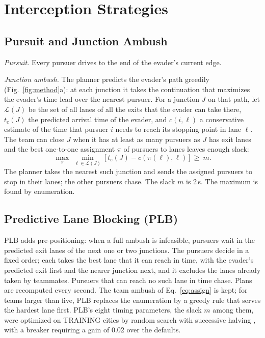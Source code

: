 \documentclass[5p,twocolumn]{elsarticle}
\begin{document}
\section{Interception Strategies}
\label{sec:strategies}

\subsection{Pursuit and Junction Ambush}

\emph{Pursuit.} Every pursuer drives to the end of the evader's current edge.

\emph{Junction ambush.} The planner predicts the evader's path greedily (Fig.~\ref{fig:method}a): at each junction it
takes the continuation that maximizes the evader's time lead over the nearest pursuer. For a junction $J$ on that
path, let $\mathcal{L}(J)$ be the set of all lanes of all the exits that the evader can take there, $t_e(J)$ the predicted
arrival time of the evader, and $c(i,\ell)$ a conservative estimate of the time that pursuer $i$ needs to reach its stopping point in lane
$\ell$. The team can close $J$ when it has at least as many pursuers as $J$ has exit lanes and the best one-to-one
assignment $\pi$ of pursuers to lanes leaves enough slack:
\begin{equation}
\label{eq:assign}
\max_{\pi}\ \min_{\ell\in\mathcal{L}(J)}\ \bigl[\,t_e(J)-c(\pi(\ell),\ell)\,\bigr] \ \ge\ m .
\end{equation}
The planner takes the nearest such junction and sends the assigned pursuers to stop in their lanes; the other
pursuers chase. The slack $m$ is 2\,s. The maximum is found by enumeration.

\subsection{Predictive Lane Blocking (PLB)}

PLB adds pre-positioning: when a full ambush is infeasible, pursuers wait in the predicted exit lanes of the next one
or two junctions. The pursuers decide in a fixed order; each takes the best lane that it can reach in time, with the
evader's predicted exit first and the nearer junction next, and it excludes the lanes already taken by teammates.
Pursuers that can reach no such lane in time chase. Plans are recomputed every second. The team ambush of
Eq.~\eqref{eq:assign} is kept; for teams larger than five, PLB replaces the enumeration by a greedy rule that serves
the hardest lane first. PLB's eight timing parameters, the slack $m$ among them, were optimized on TRAINING cities by
random search with successive halving \cite{bergstra2012,jamieson2016,li2018hyperband}, with a breaker requiring a
gain of 0.02 over the defaults.
\end{document}
